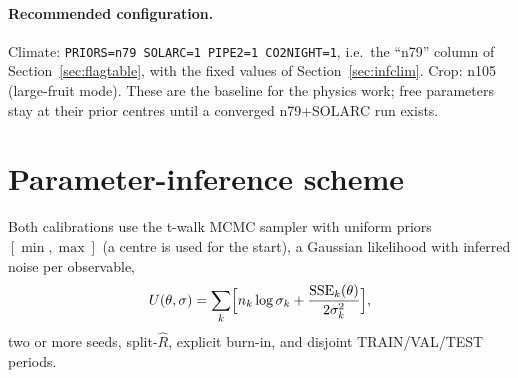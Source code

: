 \documentclass[11pt,a4paper]{article}
\begin{document}
\paragraph{Recommended configuration.} Climate: \texttt{PRIORS=n79 SOLARC=1 PIPE2=1 CO2NIGHT=1}, i.e.\ the
``n79'' column of Section~\ref{sec:flagtable}, with the fixed values of Section~\ref{sec:infclim}. Crop: n105
(large-fruit mode). These are the baseline for the physics work; free parameters stay at their prior centres
until a converged n79+SOLARC run exists.

\section{Parameter-inference scheme}\label{sec:inference}
Both calibrations use the t-walk MCMC sampler with uniform priors $[\min,\max]$ (a centre is used for the
start), a Gaussian likelihood with inferred noise per observable,
\begin{equation}
U(\theta,\sigma)=\sum_k\Bigl[n_k\log\sigma_k+\frac{\mathrm{SSE}_k(\theta)}{2\sigma_k^2}\Bigr],
\end{equation}
two or more seeds, split-$\hat R$, explicit burn-in, and disjoint TRAIN/VAL/TEST periods.
\end{document}
